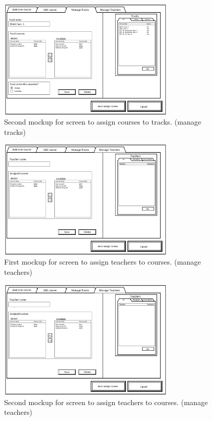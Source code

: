 \begin{figure}[htb]
\begin{center}
\leavevmode
\includegraphics[width=0.75\textwidth]{images/courseplan2_managetracks}
\end{center}
\caption{Second mockup for screen to assign courses to tracks. (manage tracks)}
\label{fig:app2_mock2_3}
\end{figure}

\begin{figure}[htb]
\begin{center}
\leavevmode
\includegraphics[width=0.75\textwidth]{images/courseplan_manageteachers}
\end{center}
\caption{First mockup for screen to assign teachers to courses. (manage teachers)}
\label{fig:app2_mock1_4}
\end{figure}

\begin{figure}[htb]
\begin{center}
\leavevmode
\includegraphics[width=0.75\textwidth]{images/courseplan2_manageteachers}
\end{center}
\caption{Second mockup for screen to assign teachers to courses. (manage teachers)}
\label{fig:app2_mock2_4}
\end{figure}

